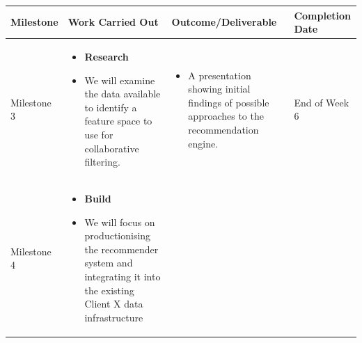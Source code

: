 \documentclass[
]{book}
\providecommand{\tightlist}{%
  \setlength{\itemsep}{0pt}\setlength{\parskip}{0pt}}
\begin{document}
\begin{longtable}[]{@{}llll@{}}
\toprule
\begin{minipage}[b]{0.14\columnwidth}\raggedright
Milestone\strut
\end{minipage} & \begin{minipage}[b]{0.30\columnwidth}\raggedright
Work Carried Out\strut
\end{minipage} & \begin{minipage}[b]{0.30\columnwidth}\raggedright
Outcome/Deliverable\strut
\end{minipage} & \begin{minipage}[b]{0.15\columnwidth}\raggedright
Completion Date\strut
\end{minipage}\tabularnewline
\midrule
\endhead
\begin{minipage}[t]{0.14\columnwidth}\raggedright
Milestone 3\strut
\end{minipage} & \begin{minipage}[t]{0.30\columnwidth}\raggedright
\begin{itemize}
\tightlist
\item
  \textbf{Research}
\item
  We will examine the data available to identify a feature space to use
  for collaborative filtering.
\end{itemize}\strut
\end{minipage} & \begin{minipage}[t]{0.30\columnwidth}\raggedright
\begin{itemize}
\tightlist
\item
  A presentation showing initial findings of possible approaches to the
  recommendation engine.
\end{itemize}\strut
\end{minipage} & \begin{minipage}[t]{0.15\columnwidth}\raggedright
End of Week 6\strut
\end{minipage}\tabularnewline
\begin{minipage}[t]{0.14\columnwidth}\raggedright
Milestone 4\strut
\end{minipage} & \begin{minipage}[t]{0.30\columnwidth}\raggedright
\begin{itemize}
\tightlist
\item
  \textbf{Build}
\item
  We will focus on productionising the recommender system and
  integrating it into the existing Client X data infrastructure
\end{itemize}\strut

\end{minipage}
\end{longtable}
\end{document}
